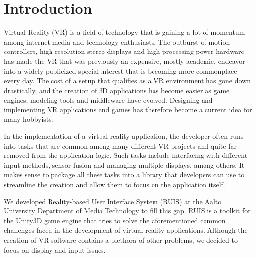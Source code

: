 \documentclass[12pt,a4paper,oneside,pdftex]{report}
\begin{document}
\startfirstchapter

\pagestyle{headings}


% 

\chapter{Introduction}
\label{chapter:intro}

Virtual Reality (VR) is a field of technology that is gaining a lot of momentum among internet media and technology enthusiasts. The outburst of motion controllers, high-resolution stereo displays and high processing power hardware has made the VR that was previously an expensive, mostly academic, endeavor into a widely publicized special interest that is becoming more commonplace every day. The cost of a setup that qualifies as a VR environment has gone down drastically, and the creation of 3D applications has become easier as game engines, modeling tools and middleware have evolved. Designing and implementing VR applications and games has therefore become a current idea for many hobbyists.

In the implementation of a virtual reality application, the developer often runs into tasks that are common among many different VR projects and quite far removed from the application logic. Such tasks include interfacing with different input methods, sensor fusion and managing multiple displays, among others. It makes sense to package all these tasks into a library that developers can use to streamline the creation and allow them to focus on the application itself. 

We developed Reality-based User Interface System (RUIS) at the Aalto University Department of Media Technology to fill this gap. RUIS is a toolkit for the Unity3D game engine that tries to solve the aforementioned common challenges faced in the development of virtual reality applications. Although the creation of VR software contains a plethora of other problems, we decided to focus on display and input issues.
\end{document}
